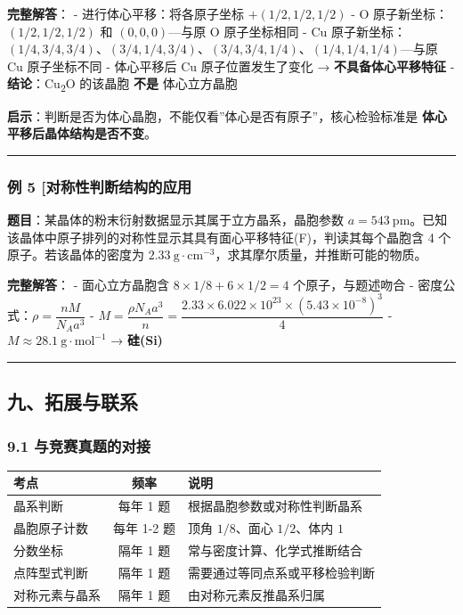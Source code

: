 \textbf{完整解答}：
- 进行体心平移：将各原子坐标 \(+(1/2, 1/2, 1/2)\)
- O 原子新坐标：\((1/2, 1/2, 1/2)\) 和 \((0, 0, 0)\)---与原 O 原子坐标相同
- Cu 原子新坐标：\((1/4, 3/4, 3/4)\)、\((3/4, 1/4, 3/4)\)、\((3/4, 3/4, 1/4)\)、\((1/4, 1/4, 1/4)\)---与原 Cu 原子坐标不同
- 体心平移后 Cu 原子位置发生了变化 → \textbf{不具备体心平移特征}
- \textbf{结论}：Cu\textsubscript{2}O 的该晶胞 \textbf{不是} 体心立方晶胞

\textbf{启示}：判断是否为体心晶胞，不能仅看''体心是否有原子''，核心检验标准是 \textbf{体心平移后晶体结构是否不变}。

\begin{center}\rule{0.5\linewidth}{0.5pt}\end{center}

\subsubsection{例 5 {[}对称性判断结构的应用}\label{ux4f8b-5-ux5bf9ux79f0ux6027ux5224ux65adux7ed3ux6784ux7684ux5e94ux7528}

\textbf{题目}：某晶体的粉末衍射数据显示其属于立方晶系，晶胞参数 \(a = 543\ \mathrm{pm}\)。已知该晶体中原子排列的对称性显示其具有面心平移特征(F)，判读其每个晶胞含 4 个原子。若该晶体的密度为 \(2.33\ \mathrm{g\cdot cm^{-3}}\)，求其摩尔质量，并推断可能的物质。

\textbf{完整解答}：
- 面心立方晶胞含 \(8 \times 1/8 + 6 \times 1/2 = 4\) 个原子，与题述吻合
- 密度公式：\(\rho = \dfrac{nM}{N_A a^3}\)
- \(M = \dfrac{\rho N_A a^3}{n} = \dfrac{2.33 \times 6.022\times 10^{23} \times (5.43\times 10^{-8})^3}{4}\)
- \(M \approx 28.1\ \mathrm{g\cdot mol^{-1}}\) → \textbf{硅(Si)}

\begin{center}\rule{0.5\linewidth}{0.5pt}\end{center}

\subsection{九、拓展与联系}\label{ux4e5dux62d3ux5c55ux4e0eux8054ux7cfb}

\subsubsection{9.1 与竞赛真题的对接}\label{ux4e0eux7adeux8d5bux771fux9898ux7684ux5bf9ux63a5}

{\def\LTcaptype{none} %
\begin{longtable}[]{@{}lcl@{}}
\toprule\noalign{}
考点 & 频率 & 说明 \\
\midrule\noalign{}
\endhead
\bottomrule\noalign{}
\endlastfoot
晶系判断 & 每年 1 题 & 根据晶胞参数或对称性判断晶系 \\
晶胞原子计数 & 每年 1-2 题 & 顶角 \(1/8\)、面心 \(1/2\)、体内 \(1\) \\
分数坐标 & 隔年 1 题 & 常与密度计算、化学式推断结合 \\
点阵型式判断 & 隔年 1 题 & 需要通过等同点系或平移检验判断 \\
对称元素与晶系 & 隔年 1 题 & 由对称元素反推晶系归属 \\
\end{longtable}
}

